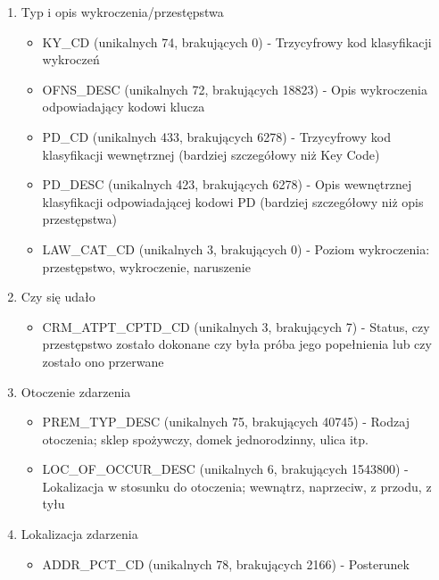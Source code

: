 \documentclass{classrep}
\begin{document}
{{\begin{enumerate}
\begin{itemize}
                    \item RPT\_DT (unikalnych 5479, brakujących 0) - Data zgłoszenia zdarzenia na policję
                \end{itemize}
                \item Typ i opis wykroczenia/przestępstwa
                \begin{itemize}
                    \item KY\_CD (unikalnych 74, brakujących 0) - Trzycyfrowy kod klasyfikacji wykroczeń
                    \item OFNS\_DESC (unikalnych 72, brakujących 18823) - Opis wykroczenia odpowiadający kodowi klucza
                    \item PD\_CD (unikalnych 433, brakujących 6278) - Trzycyfrowy kod klasyfikacji wewnętrznej (bardziej szczegółowy niż Key Code)
                    \item PD\_DESC (unikalnych 423, brakujących 6278) - Opis wewnętrznej klasyfikacji odpowiadającej kodowi PD (bardziej szczegółowy niż opis przestępstwa)
                    \item LAW\_CAT\_CD (unikalnych 3, brakujących 0) - Poziom wykroczenia: przestępstwo, wykroczenie, naruszenie
                \end{itemize}
                \item Czy się udało
                \begin{itemize}
                    \item CRM\_ATPT\_CPTD\_CD (unikalnych 3, brakujących 7) - Status, czy przestępstwo zostało dokonane czy była próba jego popełnienia lub czy zostało ono przerwane
                \end{itemize}
                \item Otoczenie zdarzenia
                \begin{itemize}
                    \item PREM\_TYP\_DESC (unikalnych 75, brakujących 40745) - Rodzaj otoczenia; sklep spożywczy, domek jednorodzinny, ulica itp.
                    \item LOC\_OF\_OCCUR\_DESC (unikalnych 6, brakujących 1543800) - Lokalizacja w stosunku do otoczenia; wewnątrz, naprzeciw, z przodu, z tyłu
                \end{itemize}
                \item Lokalizacja zdarzenia
                \begin{itemize}
                    \item ADDR\_PCT\_CD (unikalnych 78, brakujących 2166) - Posterunek

\end{itemize}
\end{enumerate}}}
\end{document}
